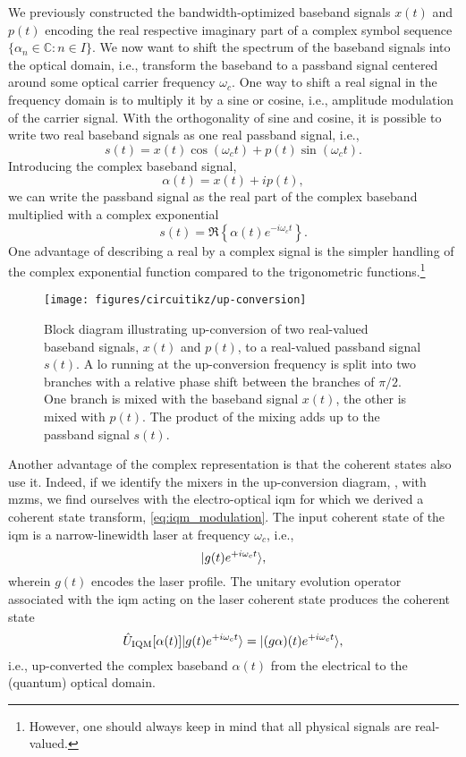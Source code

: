 We previously constructed the bandwidth-optimized baseband signals $x(t)$ and $p(t)$ encoding the real respective imaginary part of a complex symbol sequence $\{\alpha_n\in\mathbb{C}\colon n\in I\}$.
We now want to shift the spectrum of the baseband signals into the optical domain, i.e., transform the baseband to a passband signal centered around some optical carrier frequency $\omega_c$.
One way to shift a real signal in the frequency domain is to multiply it by a sine or cosine, i.e., amplitude modulation of the carrier signal.
With the orthogonality of sine and cosine, it is possible to write two real baseband signals as one real passband signal, i.e.,
\begin{equation}
	s(t)
	=
	x(t)
	\cos(\omega_ct)
	+
	p(t)
	\sin(\omega_ct)
	.
\end{equation}
Introducing the complex baseband signal,
\begin{equation}
	\alpha(t)
	=
	x(t)
	+
	ip(t)
	,
\end{equation}
we can write the passband signal as the real part of the complex baseband multiplied with a complex exponential
\begin{equation}
	s(t)
	=
	\Re\left\{
		\alpha(t)
		e^{-i\omega_ct}
	\right\}
	.
	\label{eq:real_complex_passband}
\end{equation}
One advantage of describing a real by a complex signal is the simpler handling of the complex exponential function compared to the trigonometric functions.\footnote{However, one should always keep in mind that all physical signals are real-valued.}
\begin{figure}[htb]
	\centering
	\texttt{[image: figures/circuitikz/up-conversion]}
	\caption{Block diagram illustrating up-conversion of two real-valued baseband signals, $x(t)$ and $p(t)$, to a real-valued passband signal $s(t)$. A \gls{lo} running at the up-conversion frequency is split into two branches with a relative phase shift between the branches of $\pi/2$. One branch is mixed with the baseband signal $x(t)$, the other is mixed with $p(t)$. The product of the mixing adds up to the passband signal $s(t)$.}\label{fig:up_conversion}
\end{figure}
Another advantage of the complex representation is that the coherent states also use it.
Indeed, if we identify the mixers in the up-conversion diagram, , with \gls{mzm}s, we find ourselves with the electro-optical \gls{iqm} for which we derived a coherent state transform, \cref{eq:iqm_modulation}.
The input coherent state of the \gls{iqm} is a narrow-linewidth  laser at frequency $\omega_c$, i.e.,
\begin{equation}
	\lvert g(t)e^{+i\omega_ct}\rangle
	,
\end{equation}
wherein $g(t)$ encodes the laser profile.
The unitary evolution operator associated with the \gls{iqm} acting on the laser coherent state produces the coherent state
\begin{equation}
	\hat{U}_\text{IQM}[\alpha(t)]
	\lvert g(t)e^{+i\omega_ct}\rangle
	=
	\lvert(g\alpha)(t)e^{+i\omega_ct}\rangle
	,
\end{equation}
i.e., up-converted the complex baseband $\alpha(t)$ from the electrical to the (quantum) optical domain.